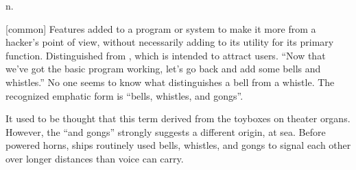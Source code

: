  n.

[common] Features added to a program or system to make it more
 from a hacker's point of view, without necessarily adding
to its utility for its primary function. Distinguished from ,
which is intended to attract users. ``Now that we've got the basic program
working, let's go back and add some bells and whistles.'' No one seems to know
what distinguishes a bell from a whistle. The recognized emphatic form is
``bells, whistles, and gongs''.

It used to be thought that this term derived from the toyboxes on theater
organs. However, the ``and gongs'' strongly suggests a different origin, at sea.
Before powered horns, ships routinely used bells, whistles, and gongs to signal
each other over longer distances than voice can carry.

